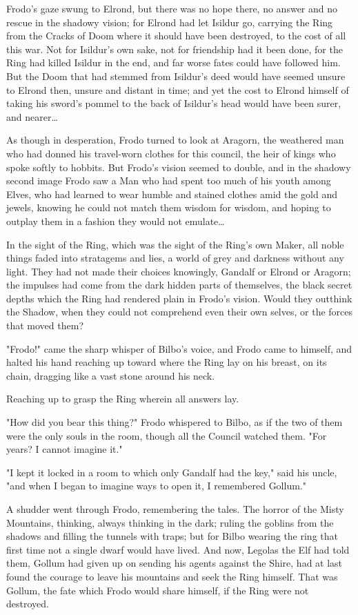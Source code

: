 Frodo's gaze swung to Elrond, but there was no hope there, no answer and no
rescue in the shadowy vision; for Elrond had let Isildur go, carrying the Ring
from the Cracks of Doom where it should have been destroyed, to the cost of all
this war. Not for Isildur's own sake, not for friendship had it been done, for
the Ring had killed Isildur in the end, and far worse fates could have followed
him. But the Doom that had stemmed from Isildur's deed would have seemed unsure
to Elrond then, unsure and distant in time; and yet the cost to Elrond himself
of taking his sword's pommel to the back of Isildur's head would have been
surer, and nearer{\ldots}

As though in desperation, Frodo turned to look at Aragorn, the weathered man
who had donned his travel-worn clothes for this council, the heir of kings who
spoke softly to hobbits. But Frodo's vision seemed to double, and in the
shadowy second image Frodo saw a Man who had spent too much of his youth among
Elves, who had learned to wear humble and stained clothes amid the gold and
jewels, knowing he could not match them wisdom for wisdom, and hoping to
outplay them in a fashion they would not emulate{\ldots}

In the sight of the Ring, which was the sight of the Ring's own Maker, all
noble things faded into stratagems and lies, a world of grey and darkness
without any light. They had not made their choices knowingly, Gandalf or Elrond
or Aragorn; the impulses had come from the dark hidden parts of themselves, the
black secret depths which the Ring had rendered plain in Frodo's vision. Would
they outthink the Shadow, when they could not comprehend even their own selves,
or the forces that moved them?

"Frodo!" came the sharp whisper of Bilbo's voice, and Frodo came to himself,
and halted his hand reaching up toward where the Ring lay on his breast, on its
chain, dragging like a vast stone around his neck.

Reaching up to grasp the Ring wherein all answers lay.

"How did you bear this thing?" Frodo whispered to Bilbo, as if the two of them
were the only souls in the room, though all the Council watched them. "For
years? I cannot imagine it."

"I kept it locked in a room to which only Gandalf had the key," said his uncle,
"and when I began to imagine ways to open it, I remembered Gollum."

A shudder went through Frodo, remembering the tales. The horror of the Misty
Mountains, thinking, always thinking in the dark; ruling the goblins from the
shadows and filling the tunnels with traps; but for Bilbo wearing the ring that
first time not a single dwarf would have lived. And now, Legolas the Elf had
told them, Gollum had given up on sending his agents against the Shire, had at
last found the courage to leave his mountains and seek the Ring himself. That
was Gollum, the fate which Frodo would share himself, if the Ring were not
destroyed.

